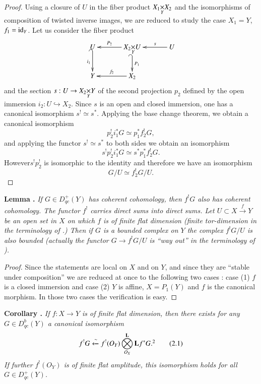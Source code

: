 \begin{proof}
Using a closure of $U$ in the fiber product $\fprod{X_{1}}{X_{2}}{Y}$ and the isomorphisms of composition of twisted inverse images, we are reduced to study the case $X_{1}=Y$, $f_{1}=\operatorname{\mathrm{id}}_{Y}$. Let us consider the fiber product
\[
\xymatrix@C=1.2cm{
U\ar@{_(->}[d]_{i_{1}} & \fprod{X_{2}}{U}{Y}\ar@{_(->}[d]^-{P_{1}}\ar[l]_-{P_{2}} & U\ar[l]_-{s}\\
Y & X_{2}\ar[l]_-{f_{2}} & 
}
\]
and the section $s:U\to \fprod{X_{2}}{Y}{Y}$ of the second projection $p_{2}$ defined by the open immersion $i_{2}:U\hookrightarrow X_{2}$. Since $s$ is an open and closed immersion, one has a canonical isomorphism $s^{!}\simeq s^{*}$. Applying the base change theorem, we obtain a canonical isomorphism
$$
p^{!}_{2}i^{*}_{1}G\simeq p^{*}_{1}f^{!}_{2}G,
$$
and applying the functor $s^{!}\simeq s^{*}$ to both sides we obtain an isomorphism
$$
s^{!}p^{!}_{2}i^{*}_{1}G\simeq s^{*}p^{*}_{1}f^{!}_{2}G.
$$
However\pageoriginale $s^{!}p^{!}_{2}$ is isomorphic to the identity and therefore we have an isomorphism
$$
G/U\simeq f^{!}_{2}G/U.
$$
\end{proof}

\medskip
\noindent
{\bf Lemma .\label{art20-lem1}}
{\em If $G\in D^{+}_{qc}(Y)$ has coherent cohomology, then $f^{!}G$ also has coherent cohomology. The functor $f^{!}$ carries direct sums into direct sums. Let $U\subset X\xrightarrow{f}Y$ be an open set in $X$ on which $f$ is of finite flat dimension (finite tor-dimension in the terminology of \cite{art20-key1}.) Then if $G$ is a bounded complex on $Y$ the complex $f^{!}G/U$ is also bounded (actually the functor $G\to f^{!}G/U$ is ``way out'' in the terminology of \cite{art20-key1}).}
\smallskip

\begin{proof}
Since the statements are local on $X$ and on $Y$, and since they are ``stable under composition'' we are reduced at once to the following two cases : case (1) $f$ is a closed immersion and case (2) $Y$ is affine, $X=P_{1}(Y)$ and $f$ is the canonical morphism. In those two cases the verification is easy.
\end{proof}

\medskip
\noindent
{\bf Corollary .\label{art20-coro2}}
{\em If $f:X\to Y$ is of finite flat dimension, then there exists for any $G\in D^{b}_{qc}(Y)$ a canonical isomorphism}
\begin{equation*}
f^{!}G\xleftarrow{\sim} f^{!}(O_{Y}) \bigotimes\limits^{\bfL}_{O_{X}}\bfL f^{*}G.\footnotemark[2]\tag{2.1}\label{art20-coro2-eq2.1}
\end{equation*}
{\em If further $f^{!}(O_{Y})$ is of finite flat amplitude, this isomorphism holds for all $G\in D^{+}_{qc}(Y)$.}
\smallskip

